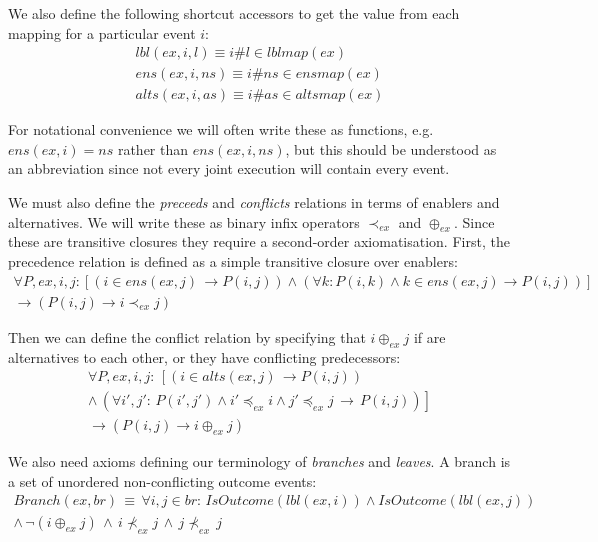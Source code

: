 We also define the following shortcut accessors to get the value from
each mapping for a particular event $i$:\begin{gather*}
lbl(ex,i,l)\equiv i\#l\in lblmap(ex)\\
ens(ex,i,ns)\equiv i\#ns\in ensmap(ex)\\
alts(ex,i,as)\equiv i\#as\in altsmap(ex)\end{gather*}


For notational convenience we will often write these as functions,
e.g. $ens(ex,i)=ns$ rather than $ens(ex,i,ns)$, but this should
be understood as an abbreviation since not every joint execution will
contain every event.

We must also define the \emph{preceeds} and \emph{conflicts} relations
in terms of enablers and alternatives. We will write these as binary
infix operators $\prec_{ex}$ and $\oplus_{ex}$. Since these are
transitive closures they require a second-order axiomatisation. First,
the precedence relation is defined as a simple transitive closure
over enablers:\begin{multline*}
\forall P,ex,i,j:\left[\left(i\in ens(ex,j)\,\rightarrow P(i,j)\right)\wedge\left(\forall k:P(i,k)\wedge k\in ens(ex,j)\rightarrow P(i,j)\right)\right]\\
\rightarrow\left(P(i,j)\rightarrow i\prec_{ex}j\right)\end{multline*}


Then we can define the conflict relation by specifying that $i\oplus_{ex}j$
if are alternatives to each other, or they have conflicting predecessors:\begin{multline*}
\forall P,ex,i,j:\,\left[\left(i\in alts(ex,j)\,\rightarrow P(i,j)\right)\right.\\
\left.\wedge\,\left(\forall i',j':\, P(i',j')\wedge i'\preceq_{ex}i\wedge j'\preceq_{ex}j\,\rightarrow\, P(i,j)\right)\right]\\
\rightarrow\left(P(i,j)\rightarrow i\oplus_{ex}j\right)\end{multline*}


\newpage{}We also need axioms defining our terminology of \emph{branches}
and \emph{leaves}. A branch is a set of unordered non-conflicting
outcome events:\begin{multline*}
Branch(ex,br)\,\equiv\,\forall i,j\in br:\, IsOutcome(lbl(ex,i))\wedge IsOutcome(lbl(ex,j))\\
\wedge\,\neg(i\oplus_{ex}j)\,\wedge\, i\not\prec_{ex}j\,\wedge\, j\not\prec_{ex}\, j\end{multline*}



